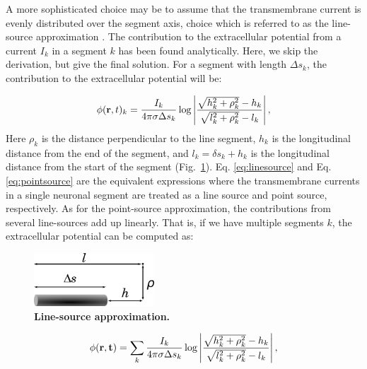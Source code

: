 A more sophisticated choice may be to assume that the transmembrane current is evenly distributed over the segment axis, choice which is referred to as the line-source approximation \citep{Holt1999, Linden2014}. The contribution to the extracellular potential from a current $I_k$ in a segment $k$ has been found analytically. Here, we skip the derivation, but give the final solution. For a segment with length $\Delta s_k$, the contribution to the extracellular potential will be:

\begin{equation}
\phi({\bf r},t)_k = \frac{I_k}{4\pi \sigma \Delta s_k} \log \left| \frac{\sqrt{h_k^2+\rho_k^2}-h_k}{\sqrt{l_k^2+\rho_k^2}-l_k} \right|,
\label{eq:linesource}
\end{equation}
Here $\rho_k$ is the distance perpendicular to the line segment, $h_k$ is the longitudinal distance from the end of the segment, and $l_k = \delta s_k + h_k$ is the longitudinal distance from the start of the segment (Fig.~\ref{VC:fig:line_source_illustration}). Eq. \ref{eq:linesource} and Eq. \ref{eq:pointsource} are the equivalent expressions where the transmembrane currents in a single neuronal segment are treated as a line source and point source, respectively. As for the point-source approximation, the contributions from several line-sources add up linearly. That is, if we have multiple segments $k$, the extracellular potential can be computed as:
\begin{figure}[!ht]
\begin{center}
\includegraphics[width=0.4\textwidth]{Figures/VC/line_source_illustration.png}
\end{center}
\caption{\textbf{Line-source approximation.} 
\cite{Holt1998} 
}
\label{VC:fig:line_source_illustration}
\end{figure}

\begin{equation}
\phi({\bf r},{\bf t}) = \sum_k \frac{I_k}{4\pi \sigma \Delta s_k} \log \left| \frac{\sqrt{h_k^2+\rho_k^2}-h_k}{\sqrt{l_k^2+\rho_k^2}-l_k} \right|,
\label{eq:linesources}
\end{equation}

